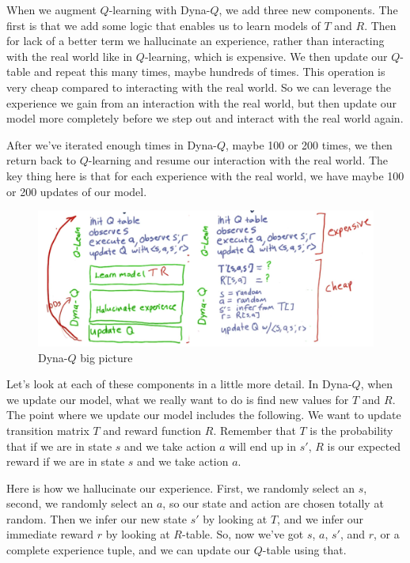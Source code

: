 \documentclass[12pt]{article}
\begin{document}
When we augment $Q$-learning with Dyna-$Q$, we add three new components. The first is that we add some logic that enables us to learn models of $T$ and $R$. Then for lack of a better term we hallucinate an experience, rather than interacting with the real world like in $Q$-learning, which is expensive. We then update our $Q$-table and repeat this many times, maybe hundreds of times. This operation is very cheap compared to interacting with the real world. So we can leverage the experience we gain from an interaction with the real world, but then update our model more completely before we step out and interact with the real world again. 

After we've iterated enough times in Dyna-$Q$, maybe 100 or 200 times, we then return back to $Q$-learning and resume our interaction with the real world. The key thing here is that for each experience with the real world, we have maybe 100 or 200 updates of our model.

\begin{figure}[!ht]
\centering
\includegraphics[scale=0.43]{fig/fig114}
\caption{Dyna-$Q$ big picture}
\end{figure}

Let's look at each of these components in a little more detail. In Dyna-$Q$, when we update our model, what we really want to do is find new values for $T$ and $R$. The point where we update our model includes the following. We want to update transition matrix $T$ and reward function $R$. Remember that $T$ is the probability that if we are in state $s$ and we take action $a$ will end up in $s'$, $R$ is our expected reward if we are in state $s$ and we take action $a$. 

Here is how we hallucinate our experience. First, we randomly select an $s$, second, we randomly select an $a$, so our state and action are chosen totally at random. Then we infer our new state $s'$ by looking at $T$, and we infer our immediate reward $r$ by looking at $R$-table. So, now we've got $s$, $a$, $s'$, and $r$, or a complete experience tuple, and we can update our $Q$-table using that. 
\end{document}
